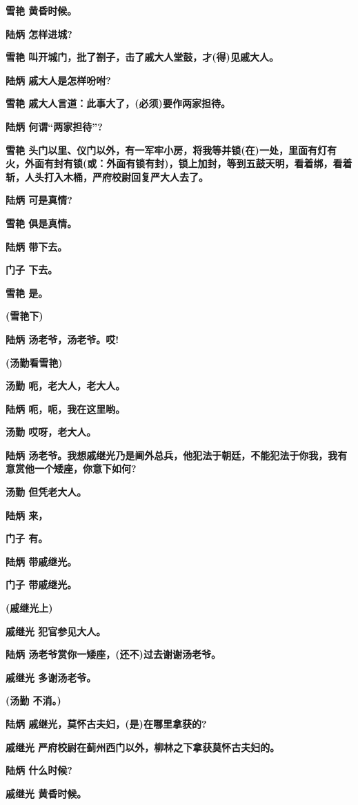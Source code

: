 \textbf{雪艳 黄昏时候。}

\textbf{陆炳 怎样进城?}

\textbf{雪艳 叫开城门，批了劄子，击了戚大人堂鼓，才(得)见戚大人。}

\textbf{陆炳 戚大人是怎样吩咐?}

\textbf{雪艳 戚大人言道：此事大了，(必须)要作两家担待。}

\textbf{陆炳 何谓``两家担待''?}

\textbf{雪艳
头门以里、仪门以外，有一军牢小房，将我等并锁(在)一处，里面有灯有火，外面有封有锁(或：外面有锁有封)，锁上加封，等到五鼓天明，看着绑，看着斩，人头打入木桶，严府校尉回复严大人去了。}

\textbf{陆炳 可是真情?}

\textbf{雪艳 俱是真情。}

\textbf{陆炳 带下去。}

\textbf{门子 下去。}

\textbf{雪艳 是。}

\textbf{(雪艳下)}

\textbf{陆炳 汤老爷，汤老爷。哎!}

\textbf{(汤勤看雪艳)}

\textbf{汤勤 呃，老大人，老大人。}

\textbf{陆炳 呃，呃，我在这里哟。}

\textbf{汤勤 哎呀，老大人。}

\textbf{陆炳
汤老爷。我想戚继光乃是阃外总兵，他犯法于朝廷，不能犯法于你我，我有意赏他一个矮座，你意下如何?}

\textbf{汤勤 但凭老大人。}

\textbf{陆炳 来，}

\textbf{门子 有。}

\textbf{陆炳 带戚继光。}

\textbf{门子 带戚继光。}

\textbf{(戚继光上)}

\textbf{戚继光 犯官参见大人。}

\textbf{陆炳 汤老爷赏你一矮座，(还不)过去谢谢汤老爷。}

\textbf{戚继光 多谢汤老爷。}

\textbf{(汤勤 不消。)}

\textbf{陆炳 戚继光，莫怀古夫妇，(是)在哪里拿获的?}

\textbf{戚继光 严府校尉在蓟州西门以外，柳林之下拿获莫怀古夫妇的。}

\textbf{陆炳 什么时候?}

\textbf{戚继光 黄昏时候。}


